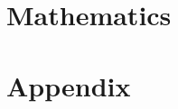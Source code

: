 \documentclass[\OPTfontsize]{book}
\renewcommand{\chaptermark}[1]{\markboth{\textsc{Chapter \thechapter. #1}}{}}
\renewcommand{\sectionmark}[1]{\markright{\textsc{\thesection\ #1}}}
\begin{document}
\part{Mathematics}
\label{part:mathematics}










\cleartooddpage[\thispagestyle{empty}] %
\part*{Appendix}


\appendix

\renewcommand{\chaptermark}[1]{\markboth{\textsc{Appendix. \thechapter. #1}}{}}
\renewcommand{\sectionmark}[1]{\markright{\textsc{\thesection\ #1}}}



\nocite{Angiuli13}
\nocite{BauerAcceptanceVideo}


{\renewcommand{\markboth}[2]{} %
\OPTbibliographyfont
}

\cleartooddpage[\thispagestyle{empty}]




\cleartooddpage[\thispagestyle{empty}]

\end{document}
